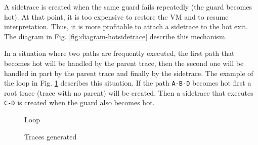 \noindent
A sidetrace is created when the same guard fails repeatedly (the guard becomes hot). At that point, it is too expensive to restore the VM and to resume interpretation. Thus, it is more profitable to attach a sidetrace to the hot exit. The diagram in Fig. \ref{fig:diagram-hotsidetrace} describe this mechanism.

In a situation where two paths are frequently executed, the first path that becomes hot will be handled by the parent trace, then the second one will be handled in part by the parent trace and finally by the sidetrace. The example of the loop in Fig. \ref{fig:recording-loop} describes this situation. If the path \texttt{A-B-D} becomes hot first a root trace (trace with no parent) will be created. Then a sidetrace that executes \texttt{C-D} is created when the guard also becomes hot. 

\begin{multicols}{2}

\begin{figure}[H]
    \hspace*{-1cm}
    \vspace*{0cm}
    \caption{Loop}
    \label{fig:recording-loop}
\end{figure}

\begin{figure}[H]
    \hspace*{0cm}
    \vspace*{0cm}
    \caption{Traces generated}
    \label{fig:recording-sidetrace}
\end{figure}

\end{multicols}

